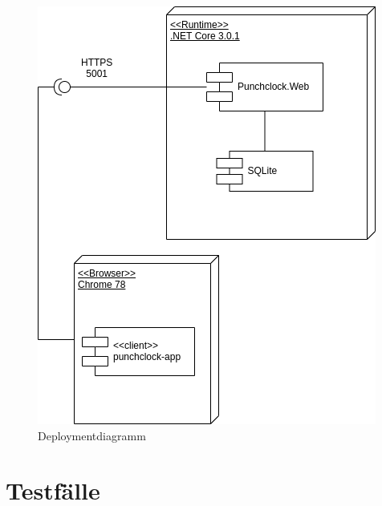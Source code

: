 \documentclass[a4paper, titlepage]{article}
\begin{document}
    \begin{figure}
        \includegraphics[width=\textwidth]{images/Deploymentdiagramm.png}
        \caption{Deploymentdiagramm}
        \label{deployment}
    \end{figure}

    \section{Testfälle}
\end{document}

